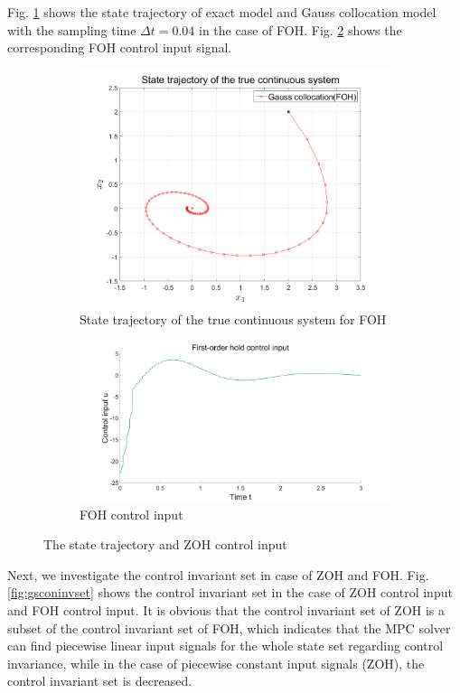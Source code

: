 Fig. \ref{fig:gcfirst.png} shows the state trajectory of exact model and Gauss collocation model with the sampling time $\Delta t = 0.04$ in the case of FOH. Fig. \ref{fig:FOHINPUT} shows the corresponding FOH control input signal.
\begin{figure}[H]
	\centering
	\begin{subfigure}[b]{0.37\textwidth}
		\centering
		\includegraphics[width=\linewidth]{pics/gcfirst.png}
		\caption{State trajectory of the true continuous system for FOH}
		\label{fig:gcfirst.png}
	\end{subfigure}
	\hfill
	\begin{subfigure}[b]{0.37\textwidth}
		\includegraphics[width=\linewidth]{pics/FOHINPUT.png}
		\caption{FOH control input}
		\label{fig:FOHINPUT}
	\end{subfigure}
	\caption{The state trajectory and ZOH control input}
	\label{fig:The FOH}
\end{figure}
Next, we investigate the control invariant set in case of ZOH and FOH. Fig. \ref{fig:gsconinvset} shows the control invariant set in the case of ZOH control input and FOH control input. It is obvious that the control invariant set of ZOH is a subset of the control invariant set of FOH, which indicates that the MPC solver can find piecewise linear input signals for the whole state set regarding control invariance, while in the case of piecewise constant input signals (ZOH), the control invariant set is decreased.
